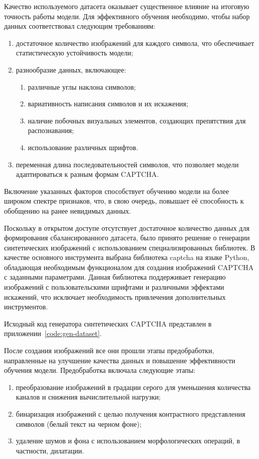 \documentclass{altsu-report}
\begin{document}
Качество используемого датасета оказывает существенное влияние на итоговую точность работы модели. Для эффективного обучения необходимо, чтобы набор данных соответствовал следующим требованиям:

\begin{enumerate}
    \item достаточное количество изображений для каждого символа, что обеспечивает статистическую устойчивость модели;
    \item разнообразие данных, включающее:
    \begin{enumerate}
        \item различные углы наклона символов;
        \item вариативность написания символов и их искажения;
        \item наличие побочных визуальных элементов, создающих препятствия для распознавания;
        \item использование различных шрифтов.
    \end{enumerate}
    \item переменная длина последовательностей символов, что позволяет модели адаптироваться к разным формам CAPTCHA.
\end{enumerate}

Включение указанных факторов способствует обучению модели на более широком спектре признаков, что, в свою очередь, повышает её способность к обобщению на ранее невидимых данных.

Поскольку в открытом доступе отсутствует достаточное количество данных для формирования сбалансированного датасета, было принято решение о генерации синтетических изображений с использованием специализированных библиотек. В качестве основного инструмента выбрана библиотека captcha на языке Python, обладающая необходимым функционалом для создания изображений CAPTCHA с заданными параметрами. Данная библиотека поддерживает генерацию изображений с пользовательскими шрифтами и различными эффектами искажений, что исключает необходимость привлечения дополнительных инструментов.

Исходный код генератора синтетических CAPTCHA представлен в приложении~\ref{code:gen-dataset}.

После создания изображений все они прошли этапы предобработки, направленные на улучшение качества данных и повышение эффективности обучения модели. Предобработка включала следующие этапы:

\begin{enumerate}
    \item преобразование изображений в градации серого для уменьшения количества каналов и снижения вычислительной нагрузки;
    \item бинаризация изображений с целью получения контрастного представления символов (белый текст на черном фоне);
    \item удаление шумов и фона с использованием морфологических операций, в частности, дилатации.
\end{enumerate}
\end{document}
